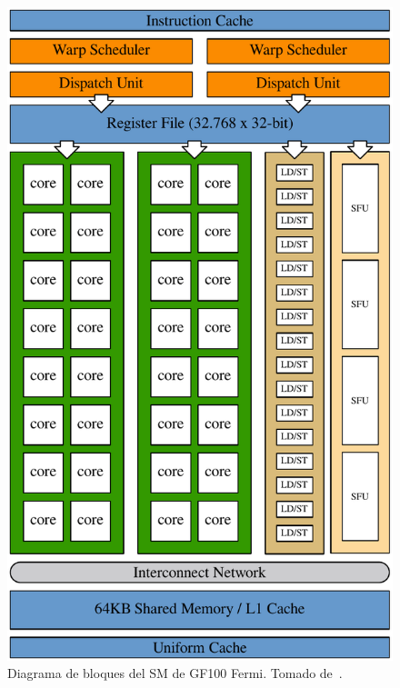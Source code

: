 \begin{figure}[htbp]
    \centering
    \includegraphics[width=\plotwidthsmaller]{images/fermi-sm.pdf}
    \caption{Diagrama de bloques del SM de GF100 Fermi. Tomado de~\cite{NvidiaFermi}.}
    \label{fermi_sm}
\end{figure}

